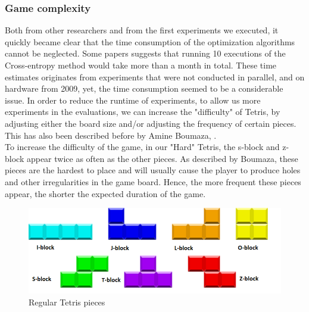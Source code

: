 \subsubsection{Game complexity \label{HardTetris}}
Both from other researchers and from the first experiments we executed, 
it quickly became clear that the time consumption of the optimization algorithms cannot be neglected.
Some papers suggests that running 10 executions of the Cross-entropy method
would take more than a month in total. These time estimates 
originates from experiments that were not conducted in parallel,
and on hardware from 2009, yet, the time consumption seemed to 
be a considerable issue.
In order to reduce the runtime of experiments, 
to allow us more experiments in the evaluations, 
we can increase the "difficulty" of Tetris, by 
adjusting either the board size and/or adjusting the 
frequency of certain pieces. This has also been described 
before by Amine Boumaza, \citep{boumaza2009}.\\
To increase the difficulty of the game,
in our "Hard" Tetris, the s-block and z-block appear twice as often 
as the other pieces. As described by Boumaza, these pieces are the hardest to
place and will usually cause the player to produce holes and other irregularities
in the game board. Hence, the more frequent these pieces appear, the 
shorter the expected duration of the game.

\begin{figure}[H]
\begin{center}
\includegraphics[scale=0.6]{img/Pieces}
\end{center}
\caption{Regular Tetris pieces \label{fig:TetrisPieces}}
\end{figure}


